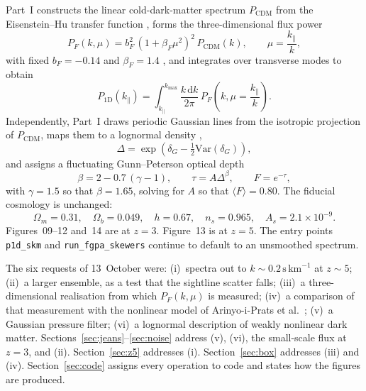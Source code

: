 \documentclass[11pt]{article}
\begin{document}
Part~I constructs the linear cold-dark-matter spectrum $P_\mathrm{CDM}$ from the Eisenstein--Hu transfer function \citep{Eisenstein:1997ik}, forms the three-dimensional flux power
\begin{equation}
\label{eq:kaiser}
P_F(k,\mu)
=
b_F^{2}\,(1+\beta_F\mu^{2})^{2}\,P_\mathrm{CDM}(k),
\qquad
\mu=\frac{k_\parallel}{k},
\end{equation}
with fixed $b_F=-0.14$ and $\beta_F=1.4$ \citep{Kaiser:1987qv,McDonald:2001fe,Gordon:2023dua}, and integrates over transverse modes to obtain
\begin{equation}
\label{eq:p1d}
P_{1\mathrm{D}}(k_\parallel)
=
\int_{k_\parallel}^{k_\mathrm{max}}
\frac{k\,\mathrm{d}k}{2\pi}\,
P_F\!\left(k,\mu=\frac{k_\parallel}{k}\right).
\end{equation}
Independently, Part~I draws periodic Gaussian lines from the isotropic projection of $P_\mathrm{CDM}$, maps them to a lognormal density \citep{Coles:1991if,Bi:1996fh},
\begin{equation}
\label{eq:lognormal}
\Delta=\exp\!\left(\delta_G-\tfrac12\mathrm{Var}(\delta_G)\right),
\end{equation}
and assigns a fluctuating Gunn--Peterson optical depth \citep{Gunn:1965hd,Hui:1997dp}
\begin{equation}
\label{eq:fgpa}
\beta=2-0.7\,(\gamma-1),
\qquad
\tau=A\Delta^{\beta},
\qquad
F=e^{-\tau},
\end{equation}
with $\gamma=1.5$ so that $\beta=1.65$, solving for $A$ so that $\langle F\rangle=0.80$.
The fiducial cosmology is unchanged:
\begin{equation}
\Omega_m=0.31,\quad
\Omega_b=0.049,\quad
h=0.67,\quad
n_s=0.965,\quad
A_s=2.1\times 10^{-9}.
\end{equation}
Figures~09--12 and~14 are at $z=3$. Figure~13 is at $z=5$.
The entry points \texttt{p1d\_skm} and \texttt{run\_fgpa\_skewers} continue to default to an unsmoothed spectrum.

The six requests of 13~October were: (i)~spectra out to $k\sim 0.2\,\mathrm{s\,km}^{-1}$ at $z\sim 5$; (ii)~a larger ensemble, as a test that the sightline scatter falls; (iii)~a three-dimensional realisation from which $P_F(k,\mu)$ is measured; (iv)~a comparison of that measurement with the nonlinear model of Arinyo-i-Prats et al.\ \citep{Arinyo-i-Prats:2015vqa}; (v)~a Gaussian pressure filter; (vi)~a lognormal description of weakly nonlinear dark matter.
Sections~\ref{sec:jeans}--\ref{sec:noise} address (v), (vi), the small-scale flux at $z=3$, and (ii).
Section~\ref{sec:z5} addresses (i).
Section~\ref{sec:box} addresses (iii) and (iv).
Section~\ref{sec:code} assigns every operation to code and states how the figures are produced.
\end{document}
